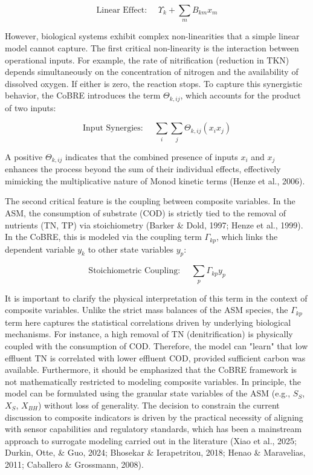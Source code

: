 \documentclass{article}
\begin{document}
\begin{equation}
\text{Linear Effect: } \quad \Upsilon_{k} + \sum_{m} B_{km} x_{m}
\end{equation}

However, biological systems exhibit complex non-linearities that a simple linear model cannot capture. The first critical non-linearity is the interaction between operational inputs. For example, the rate of nitrification (reduction in TKN) depends simultaneously on the concentration of nitrogen and the availability of dissolved oxygen. If either is zero, the reaction stops. To capture this synergistic behavior, the CoBRE introduces the term $\Theta_{k,ij}$, which accounts for the product of two inputs:

\begin{equation}
\text{Input Synergies: } \quad \sum_{i} \sum_{j} \Theta_{k,ij} (x_{i} x_{j})
\end{equation}

A positive $\Theta_{k,ij}$ indicates that the combined presence of inputs $x_{i}$ and $x_{j}$ enhances the process beyond the sum of their individual effects, effectively mimicking the multiplicative nature of Monod kinetic terms (Henze et al., 2006).

The second critical feature is the coupling between composite variables. In the ASM, the consumption of substrate (COD) is strictly tied to the removal of nutrients (TN, TP) via stoichiometry (Barker \& Dold, 1997; Henze et al., 1999). In the CoBRE, this is modeled via the coupling term $\Gamma_{kp}$, which links the dependent variable $y_{k}$ to other state variables $y_{p}$:

\begin{equation}
\text{Stoichiometric Coupling: } \quad \sum_{p} \Gamma_{kp} y_{p}
\end{equation}

It is important to clarify the physical interpretation of this term in the context of composite variables. Unlike the strict mass balances of the ASM species, the $\Gamma_{kp}$ term here captures the statistical correlations driven by underlying biological mechanisms. For instance, a high removal of TN (denitrification) is physically coupled with the consumption of COD. Therefore, the model can "learn" that low effluent TN is correlated with lower effluent COD, provided sufficient carbon was available. Furthermore, it should be emphasized that the CoBRE framework is not mathematically restricted to modeling composite variables. In principle, the model can be formulated using the granular state variables of the ASM (e.g., $S_{S}$, $X_{S}$, $X_{BH}$) without loss of generality. The decision to constrain the current discussion to composite indicators is driven by the practical necessity of aligning with sensor capabilities and regulatory standards, which has been a mainstream approach to surrogate modeling carried out in the literature (Xiao et al., 2025; Durkin, Otte, \& Guo, 2024; Bhosekar \& Ierapetritou, 2018; Henao \& Maravelias, 2011; Caballero \& Grossmann, 2008). 
\end{document}
